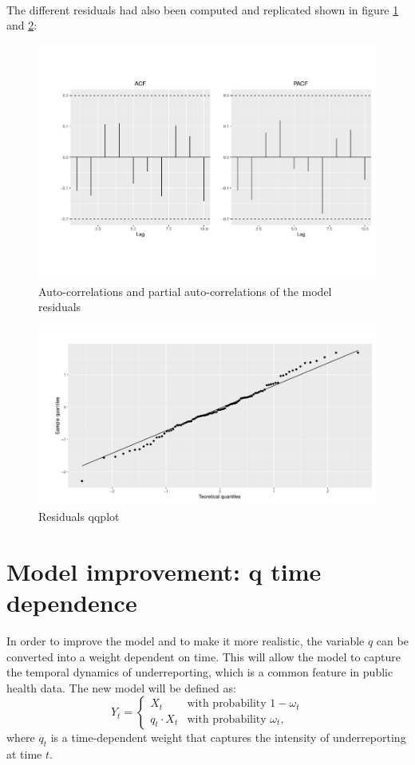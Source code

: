 \documentclass[acmsmall, nonacm]{acmart}
\begin{document}
\\
The different residuals had also been computed and replicated shown in figure \ref{fig1} and \ref{fig2}:
\begin{figure}
    \centering
    \includegraphics[width=0.8\linewidth]{fig1.png}
    \caption{Auto-correlations and partial auto-correlations of the model residuals}
    \label{fig1}
\end{figure}
\begin{figure}
    \centering
    \includegraphics[width=0.8\linewidth]{fig2.png}
    \caption{Residuals qqplot}
    \label{fig2}
\end{figure}
\section{Model improvement: q time dependence}
In order to improve the model and to make it more realistic, the variable $q$ can be converted into a weight dependent on time. This will allow the model to capture the temporal dynamics of underreporting, which is a common feature in public health data. The new model will be defined as:
\[
Y_t = 
\begin{cases} 
X_t & \text{with probability } 1 - \omega_t \\ 
q_t \cdot X_t & \text{with probability } \omega_t,
\end{cases}
\]
where $q_t$ is a time-dependent weight that captures the intensity of underreporting at time $t$.
\end{document}
